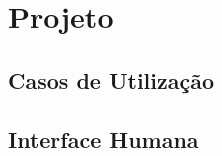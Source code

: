 \chapter{Projeto}
\label{ch:projeto}


\section{Casos de Utilização}
\label{sec:casosuso}


\section{Interface Humana}
\label{sec:interfacehumana}

